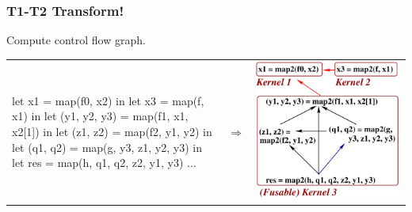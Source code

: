 \documentclass{beamer}
\begin{document}
\begin{frame}[fragile,t]
  \frametitle{T1-T2 Transform!}

Compute control flow graph.

\begin{tabular}{p{4.5cm}cp{4cm}}
\begin{minipage}{4cm}
\begin{colorcode}
let x1 = map(f0, x2) in
let x3 = map(f, x1) in
let (y1, y2, y3) =
  map(f1, x1, x2[1]) in
let (z1, z2) =
  map(f2, y1, y2) in
let (q1, q2) =
  map(g, y3, z1, y2, y3) in
let res =
  map(h, q1, q2, z2, y1, y3) ...
\end{colorcode}
\end{minipage}
&
$\Rightarrow$
&
\begin{minipage}{4cm}
\includegraphics[height=30ex]{Figures/T1T2}
\end{minipage}
\end{tabular}
\end{frame}
\end{document}
